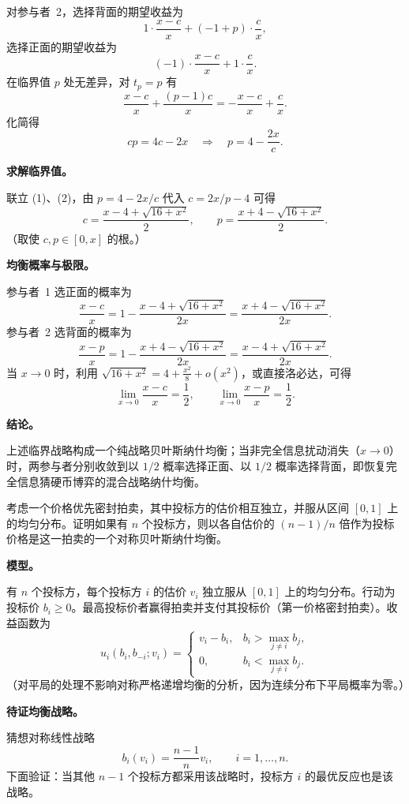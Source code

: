 对参与者~2，选择背面的期望收益为
\[
	1\cdot\frac{x-c}{x}+(-1+p)\cdot\frac{c}{x},
\]\indent
选择正面的期望收益为
\[
	(-1)\cdot\frac{x-c}{x}+1\cdot\frac{c}{x}.
\]\indent
在临界值 $p$ 处无差异，对 $t_p=p$ 有
\[
	\frac{x-c}{x}+\frac{(p-1)c}{x}=-\frac{x-c}{x}+\frac{c}{x}.
\]\indent
化简得
\[
	cp=4c-2x\quad\Longrightarrow\quad p=4-\frac{2x}{c}.\tag{2}
\]

\textbf{求解临界值。}

联立 (1)、(2)，由 $p=4-2x/c$ 代入 $c=2x/p-4$ 可得
\[
	c=\frac{x-4+\sqrt{16+x^{2}}}{2},\qquad
	p=\frac{x+4-\sqrt{16+x^{2}}}{2}.
\]\indent
（取使 $c,p\in[0,x]$ 的根。）

\textbf{均衡概率与极限。}

参与者~1 选正面的概率为
\[
	\frac{x-c}{x}
	=1-\frac{x-4+\sqrt{16+x^{2}}}{2x}
	=\frac{x+4-\sqrt{16+x^{2}}}{2x}.
\]\indent
参与者~2 选背面的概率为
\[
	\frac{x-p}{x}
	=1-\frac{x+4-\sqrt{16+x^{2}}}{2x}
	=\frac{x-4+\sqrt{16+x^{2}}}{2x}.
\]\indent
当 $x\to0$ 时，利用 $\sqrt{16+x^{2}}=4+\tfrac{x^{2}}{8}+o(x^{2})$，或直接洛必达，可得
\[
	\lim_{x\to0}\frac{x-c}{x}=\frac12,\qquad
	\lim_{x\to0}\frac{x-p}{x}=\frac12.
\]

\textbf{结论。}

上述临界战略构成一个纯战略贝叶斯纳什均衡；当非完全信息扰动消失（$x\to0$）时，两参与者分别收敛到以 $1/2$ 概率选择正面、以 $1/2$ 概率选择背面，即恢复完全信息猜硬币博弈的混合战略纳什均衡。


考虑一个价格优先密封拍卖，其中投标方的估价相互独立，并服从区间 $[0,1]$ 上的均匀分布。证明如果有 $n$ 个投标方，则以各自估价的 $(n-1)/n$ 倍作为投标价格是这一拍卖的一个对称贝叶斯纳什均衡。

\sol

\textbf{模型。}

有 $n$ 个投标方，每个投标方 $i$ 的估价 $v_i$ 独立服从 $[0,1]$ 上的均匀分布。行动为投标价 $b_i\ge0$。最高投标价者赢得拍卖并支付其投标价（第一价格密封拍卖）。收益函数为
\[
	u_i(b_i,b_{-i};v_i)=
	\begin{cases}
	v_i-b_i, & b_i>\max_{j\ne i}b_j,\\
	0, & b_i<\max_{j\ne i}b_j.
\end{cases}
\]\indent
（对平局的处理不影响对称严格递增均衡的分析，因为连续分布下平局概率为零。）

\textbf{待证均衡战略。}

猜想对称线性战略
\[
	b_i(v_i)=\frac{n-1}{n}v_i,\qquad i=1,\dots,n.
\]\indent
下面验证：当其他 $n-1$ 个投标方都采用该战略时，投标方 $i$ 的最优反应也是该战略。

